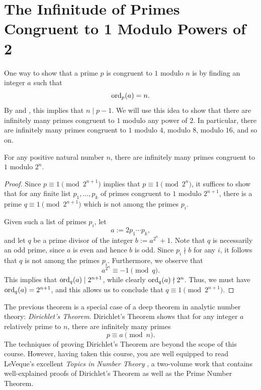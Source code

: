 \section{The Infinitude of Primes Congruent to 1 Modulo Powers of 2}

One way to show that a prime $p$ is congruent to $1$ modulo $n$ is by finding an integer $a$ such that
\begin{equation*}
  \operatorname{ord}_p(a)=n.
\end{equation*}
By  and , this implies that $n\mid p-1$. We will use this idea to show that there are infinitely many primes congruent to $1$ modulo any power of $2$. In particular, there are infinitely many primes congruent to $1$ modulo $4$, modulo $8$, modulo $16$, and so on.

\begin{theorem}\label{theorem:infinitude-of-primes-1-mod-power-of-2}
  For any positive natural number $n$, there are infinitely many primes congruent to $1$ modulo $2^n$.
\end{theorem}

\begin{proof}
  Since $p\equiv 1\pmod{2^{n+1}}$ implies that $p\equiv 1\pmod{2^n}$, it suffices to show that for any finite list $p_1,\ldots,p_k$ of primes congruent to $1$ modulo $2^{n+1}$, there is a prime $q\equiv 1\pmod{2^{n+1}}$ which is not among the primes $p_i$.

  Given such a list of primes $p_i$, let
  \begin{equation*}
    a:=2p_1\cdots p_k,
  \end{equation*}
  and let $q$ be a prime divisor of the integer $b:=a^{2^n}+1$. Note that $q$ is necessarily an odd prime, since $a$ is even and hence $b$ is odd. Since $p_i\nmid b$ for any $i$, it follows that $q$ is not among the primes $p_i$. Furthermore, we observe that
  \begin{equation*}
    a^{2^n}\equiv -1\pmod{q}.
  \end{equation*}
  This implies that $\operatorname{ord}_q(a)\mid 2^{n+1}$, while clearly $\operatorname{ord}_q(a)\nmid 2^n$. Thus, we must have $\operatorname{ord}_q(a)=2^{n+1}$, and this allows us to conclude that $q\equiv 1\pmod{2^{n+1}}$.
\end{proof}

The previous theorem is a special case of a deep theorem in analytic number theory: \emph{Dirichlet's Theorem}. Dirichlet's Theorem shows that for any integer $a$ relatively prime to $n$, there are infinitely many primes
\begin{equation*}
  p\equiv a\pmod{n}.
\end{equation*}
The techniques of proving Dirichlet's Theorem are beyond the scope of this course. However, having taken this course, you are well equipped to read LeVeque's excellent \emph{Topics in Number Theory} \cite{leveque1956vol1,leveque1956vol2}, a two-volume work that contains well-explained proofs of Dirichlet's Theorem as well as the Prime Number Theorem.

